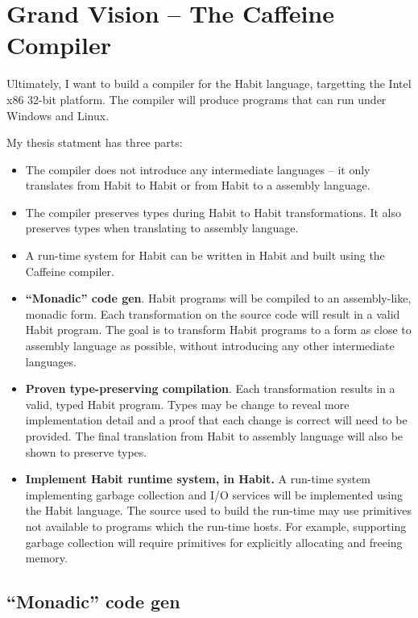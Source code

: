 \documentclass[11pt]{article}
\begin{document}
\section{Grand Vision -- The Caffeine Compiler}

Ultimately, I want to build a compiler for the Habit language,
targetting the Intel x86 32-bit platform. The compiler will produce
programs that can run under Windows and Linux. 

My thesis statment has three parts:

\begin{itemize}
\item The compiler does not introduce any intermediate languages -- it
  only translates from Habit to Habit or from Habit to a assembly
  language.
\item The compiler preserves types during Habit to Habit
  transformations. It also preserves types when translating to
  assembly language.
\item A run-time system for Habit can be written in Habit and built
  using the Caffeine compiler.
\end{itemize}

\begin{itemize}
\item \textbf{``Monadic'' code gen}. Habit programs will be compiled
  to an assembly-like, monadic form. Each transformation on the source
  code will result in a valid Habit program. The goal is to transform
  Habit programs to a form as close to assembly language as possible,
  without introducing any other intermediate languages.
\item \textbf{Proven type-preserving compilation}. Each transformation 
  results in a valid, typed Habit program. Types may be change to reveal
  more implementation detail and a proof that each change is correct will
  need to be provided. The final translation from Habit to assembly language
  will also be shown to preserve types.
\item \textbf{Implement Habit runtime system, in Habit.} A run-time
  system implementing garbage collection and I/O services will be
  implemented using the Habit language. The source used to build the
  run-time may use primitives not available to programs which the
  run-time hosts. For example, supporting garbage collection will
  require primitives for explicitly allocating and freeing memory.
\end{itemize}

\subsection{``Monadic'' code gen}
\end{document}
